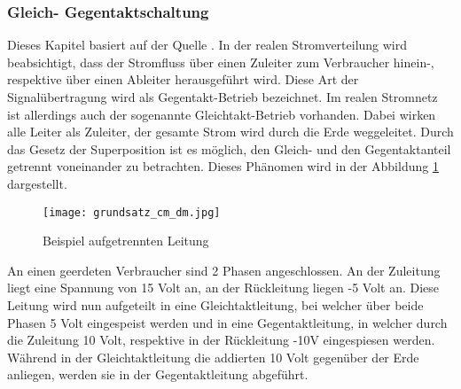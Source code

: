 \subsubsection{Gleich- Gegentaktschaltung} \label{subsubsec:gegentakt}

Dieses Kapitel basiert auf der Quelle \cite{p._niklaus_2-tore_2019}. In der realen Stromverteilung wird beabsichtigt, dass der Stromfluss über einen Zuleiter zum Verbraucher hinein-, respektive über einen Ableiter herausgeführt wird. 
Diese Art der Signalübertragung wird als Gegentakt-Betrieb bezeichnet. Im realen Stromnetz ist allerdings auch der sogenannte Gleichtakt-Betrieb vorhanden. Dabei wirken alle Leiter als Zuleiter, der gesamte Strom wird durch die Erde weggeleitet. Durch das Gesetz der Superposition ist es möglich, den Gleich- und den Gegentaktanteil getrennt voneinander zu betrachten. Dieses Phänomen wird in der Abbildung \ref{fig:auftrennen_der_leitung} dargestellt.  

\begin{figure}[H]
	\centering
	\texttt{[image: grundsatz\_cm\_dm.jpg]}
	\caption{Beispiel aufgetrennten Leitung }
	\label{fig:auftrennen_der_leitung}
\end{figure} 


An einen geerdeten Verbraucher sind 2 Phasen angeschlossen. An der Zuleitung liegt eine Spannung von 15 Volt an, an der Rückleitung liegen -5 Volt an. Diese Leitung wird nun aufgeteilt in eine Gleichtaktleitung, bei welcher über beide Phasen 5 Volt eingespeist werden und in eine Gegentaktleitung, in welcher durch die Zuleitung 10 Volt, respektive in der Rückleitung -10V eingespiesen werden. Während in der Gleichtaktleitung die addierten 10 Volt gegenüber der Erde anliegen, werden sie in der Gegentaktleitung abgeführt. 


\newpage




